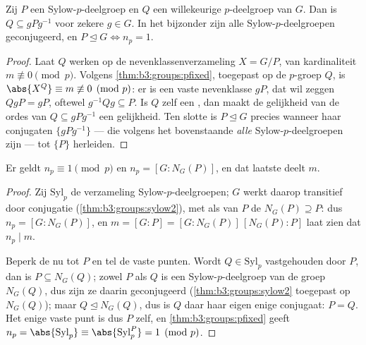 \begin{theorem}\label{thm:b3:groups:sylow2}
Zij $P$ een Sylow-$p$-deelgroep en $Q$ een willekeurige
$p$-deelgroep van $G$. Dan is $Q \subseteq gPg^{-1}$ voor zekere $g
\in G$. In het bijzonder zijn alle Sylow-$p$-deelgroepen
geconjugeerd, en $P \trianglelefteq G \iff n_p = 1$.
\end{theorem}

\begin{proof}
Laat $Q$ werken op de nevenklassenverzameling $X = G/P$, van
kardinaliteit $m \not\equiv 0 \pmod p$. Volgens
\cref{thm:b3:groups:pfixed}, toegepast op de $p$-groep $Q$, is
$\abs{X^Q} \equiv m \not\equiv 0 \pmod p$: er is een vaste
nevenklasse $gP$, dat wil zeggen $QgP = gP$, oftewel $g^{-1}Qg
\subseteq P$. Is $Q$ zelf een , dan maakt de
gelijkheid van de ordes van $Q \subseteq gPg^{-1}$ een gelijkheid.
Ten slotte is $P \trianglelefteq G$ precies wanneer haar
conjugaten $\{gPg^{-1}\}$ --- die volgens het bovenstaande
\emph{alle} Sylow-$p$-deelgroepen zijn --- tot $\{P\}$ herleiden.
\end{proof}

\begin{theorem}\label{thm:b3:groups:sylow3}
Er geldt $n_p \equiv 1 \pmod p$ en $n_p = [G : N_G(P)]$, en dat
laatste deelt $m$.
\end{theorem}

\begin{proof}
Zij $\mathrm{Syl}_p$ de verzameling Sylow-$p$-deelgroepen; $G$
werkt daarop transitief door conjugatie
(\cref{thm:b3:groups:sylow2}), met als  van $P$ de
 $N_G(P) \supseteq P$: dus $n_p = [G : N_G(P)]$, en $m
= [G:P] = [G:N_G(P)]\,[N_G(P):P]$ laat zien dat $n_p \mid m$.

Beperk de  nu tot $P$ en tel de vaste punten. Wordt $Q \in
\mathrm{Syl}_p$ vastgehouden door $P$, dan is $P \subseteq N_G(Q)$;
zowel $P$ als $Q$ is een Sylow-$p$-deelgroep van de groep $N_G(Q)$,
dus zijn ze daarin geconjugeerd (\cref{thm:b3:groups:sylow2}
toegepast op $N_G(Q)$); maar $Q \trianglelefteq N_G(Q)$, dus is $Q$
daar haar eigen enige conjugaat: $P = Q$. Het enige vaste punt is
dus $P$ zelf, en \cref{thm:b3:groups:pfixed} geeft $n_p =
\abs{\mathrm{Syl}_p} \equiv \abs{\mathrm{Syl}_p^P} = 1 \pmod p$.
\end{proof}

